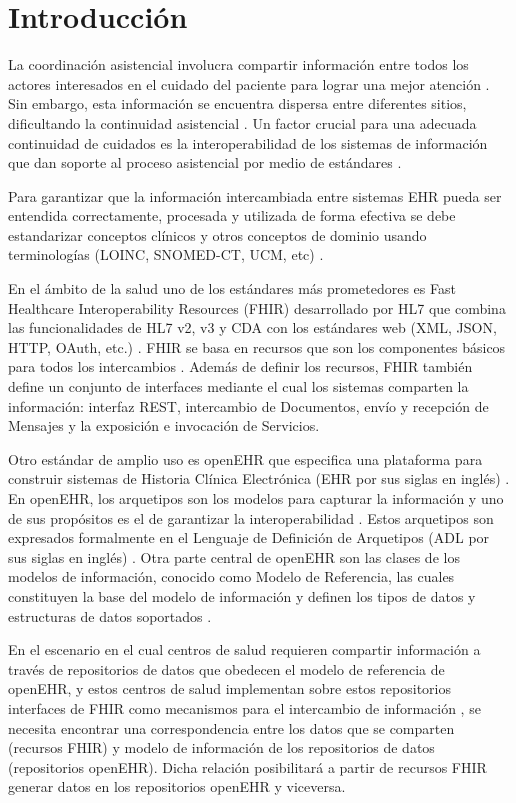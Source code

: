 \section{Introducción}

La coordinación asistencial involucra compartir información entre todos los actores interesados en el cuidado del paciente para lograr una mejor atención \cite{CareCoordination}. Sin embargo, esta información se encuentra dispersa entre diferentes sitios, dificultando la continuidad asistencial \cite{Indarte11}. Un factor crucial para una adecuada continuidad de cuidados es la interoperabilidad de los sistemas de información que dan soporte al proceso asistencial por medio de estándares \cite{OPS16}.

Para garantizar que la información intercambiada entre sistemas EHR pueda ser entendida correctamente, procesada y utilizada de forma efectiva se debe estandarizar conceptos clínicos y otros conceptos de dominio usando terminologías (LOINC, SNOMED-CT, UCM, etc) \cite{ISO20514}.

En el ámbito de la salud uno de los estándares más prometedores es Fast Healthcare Interoperability Resources (FHIR) desarrollado por HL7 que combina las funcionalidades de HL7 v2, v3 y CDA con los estándares web (XML, JSON, HTTP, OAuth, etc.) \cite{FHIR}. FHIR se basa en recursos que son los componentes básicos para todos los intercambios \cite{FHIROverview}. Además de definir los recursos, FHIR también define un conjunto de interfaces mediante el cual los sistemas comparten la información: interfaz REST, intercambio de Documentos, envío y recepción de Mensajes y la exposición e invocación de Servicios.

Otro estándar de amplio uso es openEHR que especifica una plataforma para construir sistemas de Historia Clínica Electrónica (EHR por sus siglas en inglés) \cite{openEHR}. En openEHR, los arquetipos son los modelos para capturar la información y uno de sus propósitos es el de garantizar la interoperabilidad \cite{Bale00}. Estos arquetipos son expresados formalmente en el Lenguaje de Definición de Arquetipos (ADL por sus siglas en inglés) \cite{ADL}. Otra parte central de openEHR son las clases de los modelos de información, conocido como Modelo de Referencia, las cuales constituyen la base del modelo de información y definen los tipos de datos y estructuras de datos soportados \cite{RM}.

En el escenario en el cual centros de salud requieren compartir información a través de repositorios de datos que obedecen el modelo de referencia de openEHR, y estos centros de salud implementan sobre estos repositorios interfaces de FHIR como mecanismos para el intercambio de información \cite{Lopez16}, se necesita encontrar una correspondencia entre los datos que se comparten (recursos FHIR) y modelo de información de los repositorios de datos (repositorios openEHR). Dicha relación posibilitará a partir de recursos FHIR generar datos en los repositorios openEHR y viceversa.


